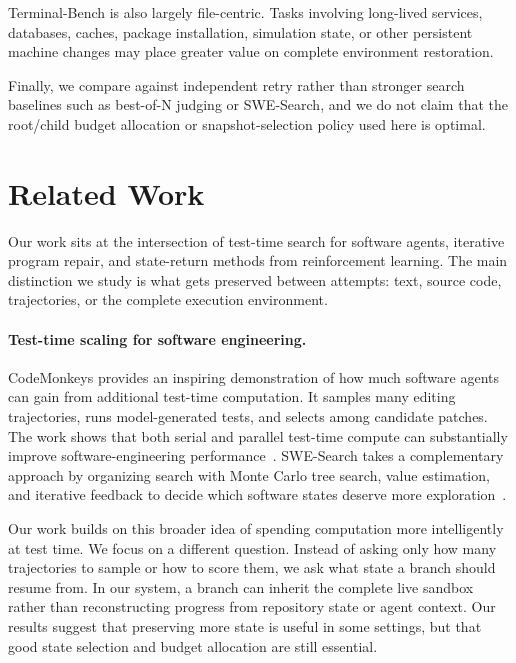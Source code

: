 \documentclass{article}
\begin{document}
Terminal-Bench is also largely file-centric. Tasks involving long-lived services, databases, caches, package installation, simulation state, or other persistent machine changes may place greater value on complete environment restoration.

Finally, we compare against independent retry rather than stronger search baselines such as best-of-N judging or SWE-Search, and we do not claim that the root/child budget allocation or snapshot-selection policy used here is optimal.

\section{Related Work}
\label{sec:related}

Our work sits at the intersection of test-time search for software agents, iterative program repair, and state-return methods from reinforcement learning. The main distinction we study is what gets preserved between attempts: text, source code, trajectories, or the complete execution environment.

\paragraph{Test-time scaling for software engineering.}
CodeMonkeys provides an inspiring demonstration of how much software agents can gain from additional test-time computation. It samples many editing trajectories, runs model-generated tests, and selects among candidate patches. The work shows that both serial and parallel test-time compute can substantially improve software-engineering performance~\citep{ehrlich2025codemonkeys}. SWE-Search takes a complementary approach by organizing search with Monte Carlo tree search, value estimation, and iterative feedback to decide which software states deserve more exploration~\citep{antoniades2024swesearch}.

Our work builds on this broader idea of spending computation more intelligently at test time. We focus on a different question. Instead of asking only how many trajectories to sample or how to score them, we ask what state a branch should resume from. In our system, a branch can inherit the complete live sandbox rather than reconstructing progress from repository state or agent context. Our results suggest that preserving more state is useful in some settings, but that good state selection and budget allocation are still essential.
\end{document}
